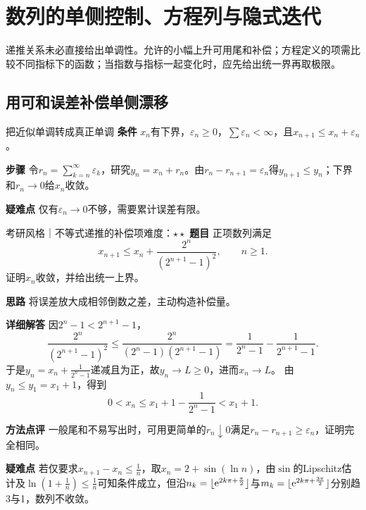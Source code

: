\section{数列的单侧控制、方程列与隐式迭代}\label{cs:section}
\begin{examtip}
递推关系未必直接给出单调性。允许的小幅上升可用尾和补偿；方程定义的项需比较不同指标下的函数；当指数与指标一起变化时，应先给出统一界再取极限。
\end{examtip}

\subsection{用可和误差补偿单侧漂移}\label{cs:drift}
\begin{method}{把近似单调转成真正单调}
\textbf{条件} $x_n$有下界，$\varepsilon_n\ge0$，$\sum\varepsilon_n<\infty$，且$x_{n+1}\le x_n+\varepsilon_n$。
\par\textbf{步骤} 令$r_n=\sum_{k=n}^{\infty}\varepsilon_k$，研究$y_n=x_n+r_n$。由$r_n-r_{n+1}=\varepsilon_n$得$y_{n+1}\le y_n$；下界和$r_n\to0$给$x_n$收敛。
\par\textbf{疑难点} 仅有$\varepsilon_n\to0$不够，需要累计误差有限。
\end{method}
\begin{example}{考研风格｜不等式递推的补偿项}{难度：$\star\star$}\label{cs:ex:drift}
\textbf{题目} 正项数列满足
\[
x_{n+1}\le x_n+\dfrac{2^n}{(2^{n+1}-1)^2},\qquad n\ge1.
\]
证明$x_n$收敛，并给出统一上界。
\par\textbf{思路} 将误差放大成相邻倒数之差，主动构造补偿量。
\par\textbf{详细解答} 因$2^n-1<2^{n+1}-1$，
\[
\dfrac{2^n}{(2^{n+1}-1)^2}
\le\dfrac{2^n}{(2^n-1)(2^{n+1}-1)}
=\dfrac1{2^n-1}-\dfrac1{2^{n+1}-1}.
\]
于是$y_n=x_n+\frac{1}{2^n-1}$递减且为正，故$y_n\to L\ge0$，进而$x_n\to L$。
由$y_n\le y_1=x_1+1$，得到
\[
0<x_n\le x_1+1-\dfrac1{2^n-1}<x_1+1.
\]
\par\textbf{方法点评} 一般尾和不易写出时，可用更简单的$r_n\downarrow0$满足$r_n-r_{n+1}\ge\varepsilon_n$，证明完全相同。
\par\textbf{疑难点} 若仅要求$x_{n+1}-x_n\le\frac{1}{n}$，取$x_n=2+\sin(\ln n)$，由$\sin$的Lipschitz估计及$\ln(1+\frac{1}{n})\le\frac{1}{n}$可知条件成立，但沿$n_k=\lfloor\mathrm{e}^{2k\pi+\frac{\pi}{2}}\rfloor$与$m_k=\lfloor\mathrm{e}^{2k\pi+\frac{3\pi}{2}}\rfloor$分别趋3与1，数列不收敛。
\end{example}

